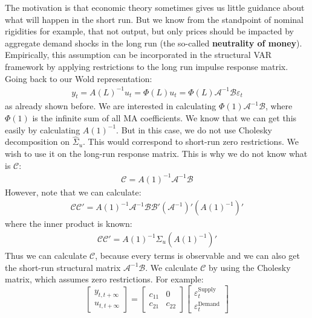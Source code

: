 \documentclass[a4paper, 12pt]{article}
\begin{document}
\noindent The motivation is that economic theory sometimes gives us little guidance about what will happen in the short run. But we know from the standpoint of nominal rigidities for example, that not output, but only prices should be impacted by aggregate demand shocks in the long run (the so-called \textbf{neutrality of money}). 
Empirically, this assumption can be incorporated in the structural VAR framework by applying restrictions to the long run impulse response matrix. Going back to our Wold representation: 
\begin{equation}
\begin{aligned}
y_t=A(L)^{-1}u_t = \Phi(L)u_t=\Phi(L)\mathcal{A}^{-1}\mathcal{B}\varepsilon_{t}\nonumber
\end{aligned}
\end{equation}
as already shown before. We are interested in calculating $\Phi(1)\mathcal{A}^{-1}\mathcal{B}$, where $\Phi(1)$ is the infinite sum of all MA coefficients. We know that we can get this easily by calculating $A(1)^{-1}$. But in this case, we do not use Cholesky decomposition on $\hat{\Sigma}_u$. This would correspond to short-run zero restrictions. We wish to use it on the long-run response matrix. 
This is why we do not know what is $\mathcal{C}$:
\begin{equation}
\begin{aligned}
\mathcal{C}=A(1)^{-1}\mathcal{A}^{-1}\mathcal{B}\nonumber
\end{aligned}
\end{equation}
However, note that we can calculate:
\begin{equation}
\begin{aligned}
\mathcal{C} \mathcal{C}'= A(1)^{-1} \mathcal{A}^{-1} \mathcal{B} \mathcal{B}' (\mathcal{A}^{-1})' (A(1)^{-1})' \nonumber 
\end{aligned}
\end{equation}
where the inner product is known:
\begin{equation}
\begin{aligned}
\mathcal{C} \mathcal{C}'= A(1)^{-1} \Sigma_u (A(1)^{-1})' \nonumber 
\end{aligned}
\end{equation}
Thus we can calculate $\mathcal{C}$, because every terms is observable and we can also get the short-run structural matrix $\mathcal{A}^{-1}\mathcal{B}$. We calculate $\mathcal{C}$ by using the Cholesky matrix, which assumes zero restrictions. For example:
\[
\begin{bmatrix}
y_{t,t+\infty} \\
u_{t,t+\infty}
\end{bmatrix}
=
\begin{bmatrix}
c_{11} & 0 \\
c_{21} & c_{22}
\end{bmatrix}
\begin{bmatrix}
\varepsilon^{\text{Supply}}_t \\
\varepsilon^{\text{Demand}}_t
\end{bmatrix}
\]
\end{document}
